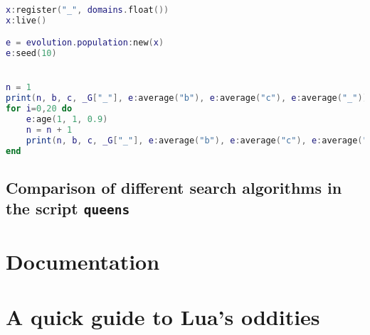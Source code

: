 \begin{appendices}
\begin{lstlisting}[language=lua, caption={Test program for self-adaptation of the mutation rate in the module \texttt{evolution}}, label=lst:adaptationperformance, name=lst:adaptationperformance]
x:register("_", domains.float())
x:live()

e = evolution.population:new(x)
e:seed(10)


n = 1
print(n, b, c, _G["_"], e:average("b"), e:average("c"), e:average("_"))
for i=0,20 do
    e:age(1, 1, 0.9)
    n = n + 1
    print(n, b, c, _G["_"], e:average("b"), e:average("c"), e:average("_"))
end
\end{lstlisting}


\section{Comparison of different search algorithms in the script \texttt{queens}}
\label{sec:app:queensperformance}

\chapter{Documentation}

\chapter{A quick guide to Lua's oddities}

\end{appendices}